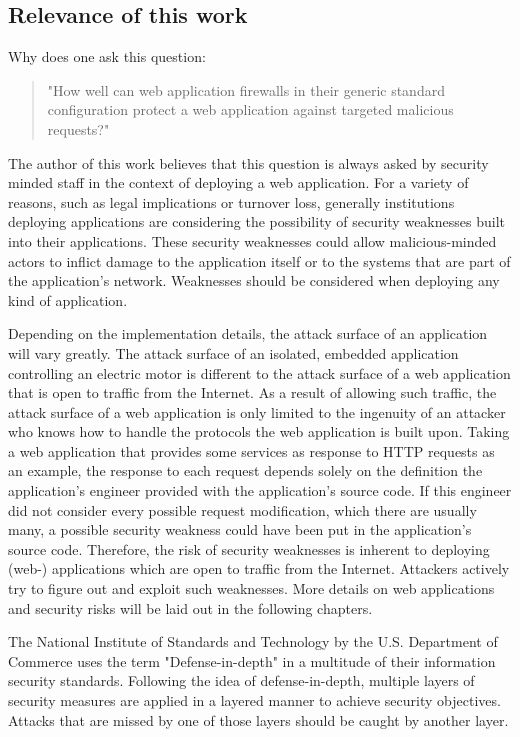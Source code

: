 \subsection{Relevance of this work}
Why does one ask this question:
\begin{quote} "How well can web application firewalls in their generic standard configuration protect a web application against targeted malicious requests?" 
\end{quote}
The author of this work believes that this question is always asked by security minded staff in the context of deploying a web application.
For a variety of reasons, such as legal implications or turnover loss, generally institutions deploying applications are considering the possibility of security weaknesses built into their applications. These security weaknesses could allow malicious-minded actors to inflict damage to the application itself or to the systems that are part of the application's network.
Weaknesses should be considered when deploying any kind of application.

Depending on the implementation details, the attack surface of an application will vary greatly. The attack surface of an isolated, embedded application controlling an electric motor is different to the attack surface of a web application that is open to traffic from the Internet. As a result of allowing such traffic, the attack surface of a web application is only limited to the ingenuity of an attacker who knows how to handle the protocols the web application is built upon.
Taking a web application that provides some services as response to HTTP requests as an example, the response to each request depends solely on the definition the application's engineer provided with the application's source code. If this engineer did not consider every possible request modification, which there are usually many, a possible security weakness could have been put in the application's source code. Therefore, the risk of security weaknesses is inherent to deploying (web-) applications which are open to traffic from the Internet. Attackers actively try to figure out and exploit such weaknesses. More details on web applications and security risks will be laid out in the following chapters.

The National Institute of Standards and Technology by the U.S. Department of Commerce uses the term "Defense-in-depth" in a multitude of their information security standards. 
Following the idea of defense-in-depth, multiple layers of security measures are applied in a layered manner to achieve security objectives. Attacks that are missed by one of those layers should be caught by another layer. \cite{nist/did}

